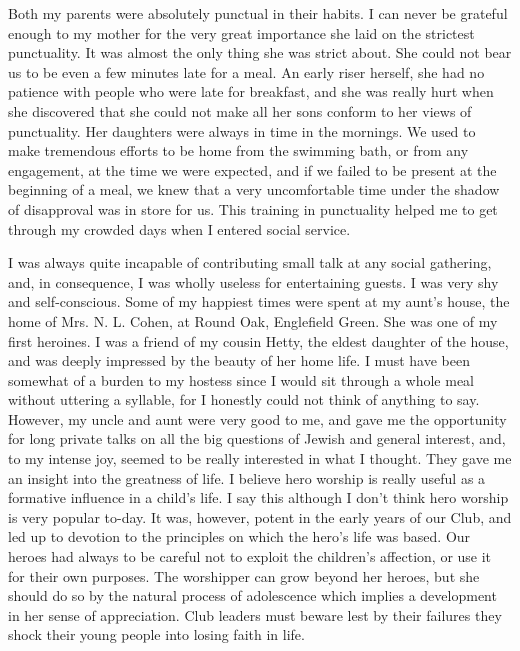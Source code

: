 Both my parents were absolutely punctual in their
habits. I can never be grateful enough to my mother for
the very great importance she laid on the strictest punctuality.
It was almost the only thing she was strict about.
She could not bear us to be even a few minutes late for a
meal. An early riser herself, she had no patience with
people who were late for breakfast, and she was really
hurt when she discovered that she could not make all her
sons conform to her views of punctuality. Her daughters
were always in time in the mornings. We used to make
tremendous efforts to be home from the swimming bath,
or from any engagement, at the time we were expected,
and if we failed to be present at the beginning of a meal,
we knew that a very uncomfortable time under the
shadow of disapproval was in store for us. This training
in punctuality helped me to get through my crowded days
when I entered social service.

I was always quite incapable of contributing small talk
at any social gathering, and, in consequence, I was wholly
useless for entertaining guests. I was very shy and self-conscious.
Some of my happiest times were spent at my
aunt’s house, the home of Mrs. N. L. Cohen, at Round
Oak, Englefield Green. She was one of my first heroines.
I was a friend of my cousin Hetty, the eldest daughter of
the house, and was deeply impressed by the beauty of her
home life. I must have been somewhat of a burden to my
hostess since I would sit through a whole meal without
uttering a syllable, for I honestly could not think of anything
to say. However, my uncle and aunt were very good
to me, and gave me the opportunity for long private talks
on all the big questions of Jewish and general interest,
and, to my intense joy, seemed to be really interested in
what I thought. They gave me an insight into the greatness
of life. I believe hero worship is really useful as a
formative influence in a child’s life. I say this although I
don’t think hero worship is very popular to-day. It was,
however, potent in the early years of our Club, and led up
to devotion to the principles on which the hero’s life was
based. Our heroes had always to be careful not to exploit
the children’s affection, or use it for their own purposes.
The worshipper can grow beyond her heroes, but she
should do so by the natural process of adolescence which
implies a development in her sense of appreciation. Club
leaders must beware lest by their failures they shock their
young people into losing faith in life.

